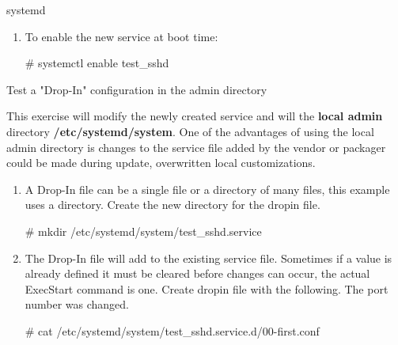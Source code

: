 \begin{Lab}
\begin{exe} {systemd}
\begin{enumerate}
\begin{raw}
# systemctl status test_sshd
test_sshd.service - test
   Loaded: loaded (/usr/lib/systemd/system/test_sshd.service; disabled; vendor preset: disabled)
   Active: active (running) since Mon 2019-08-12 10:50:24 CDT; 2s ago
 Main PID: 5449 (sshd)
    Tasks: 1 (limit: 2356)
   Memory: 1.2M
   CGroup: /system.slice/test_sshd.service
           |_5449 /usr/sbin/sshd -D -oCiphers=aes256-gcm@openssh.com,chacha20-poly1305@openssh.com

Aug 12 10:50:24 rt.example.com systemd[1]: Starting test...
Aug 12 10:50:24 rt.example.com sshd[5449]: Server listening on 0.0.0.0 port 4222.
Aug 12 10:50:24 rt.example.com sshd[5449]: Server listening on :: port 4222.
Aug 12 10:50:24 rt.example.com systemd[1]: Started test.
		\end{raw}
	\item To enable the new service at boot time: 
		\begin{raw}
# systemctl enable test_sshd
		\end{raw} 
	\end{enumerate}
\end{exe} 


\begin{exe}
	{Test a "Drop-In" configuration in the admin directory}

	This exercise will modify the newly created service and will the 
	\textbf{local admin} directory \textbf{/etc/systemd/system}. 
	One of the advantages of using the local admin directory is 
	changes to the service file added by the vendor or 
	packager could be made during update, overwritten local customizations.

	\begin{enumerate} 
		\item
		A Drop-In file can be a single file or a directory 
			of many files, this 
			example uses a directory.
		Create the new directory for the dropin file.
		\begin{raw}
# mkdir /etc/systemd/system/test_sshd.service
		\end{raw}

		\item 
		The Drop-In file will add to the existing service file. Sometimes 
			if a value is already defined it must be cleared before 
			changes can occur, the actual ExecStart command is one. Create 
			dropin file with the following. The port number was changed. 

		\begin{raw}
# cat /etc/systemd/system/test_sshd.service.d/00-first.conf


\end{raw}
\end{enumerate}
\end{exe}
\end{Lab}
